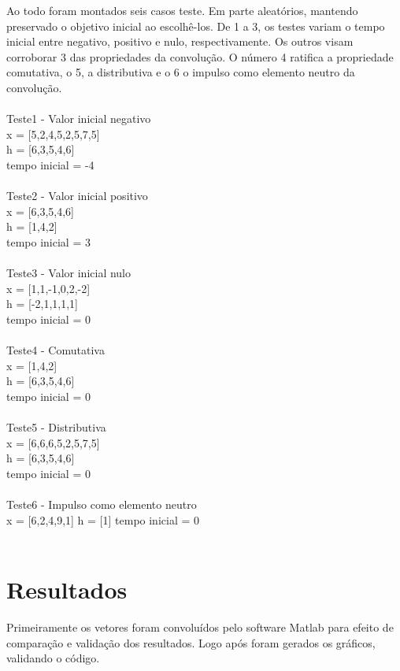 \documentclass[dvipdfm, a4paper, 11pt]{report}
\begin{document}
{Ao todo foram montados seis casos teste. Em parte aleatórios, mantendo preservado o objetivo inicial ao escolhê-los.
De 1 a 3, os testes variam o tempo inicial entre negativo, positivo e nulo, respectivamente. Os outros visam corroborar 3 das propriedades da convolução. O número 4 ratifica a propriedade comutativa, o 5, a distributiva e o 6 o impulso como elemento neutro da convolução.\\
\\
Teste1 - Valor inicial negativo\\
x = [5,2,4,5,2,5,7,5]\\
h = [6,3,5,4,6]\\
tempo inicial = -4\\
\\
Teste2 - Valor inicial positivo\\
x = [6,3,5,4,6]\\
h = [1,4,2]\\
tempo inicial = 3\\
\\
Teste3 - Valor inicial nulo\\
x = [1,1,-1,0,2,-2]\\
h = [-2,1,1,1,1]\\
tempo inicial = 0\\
\\
Teste4 - Comutativa\\
x = [1,4,2]\\
h = [6,3,5,4,6]\\
tempo inicial = 0\\
\\
Teste5 - Distributiva\\
x = [6,6,6,5,2,5,7,5]\\
h = [6,3,5,4,6]\\
tempo inicial = 0\\
\\
Teste6 - Impulso como elemento neutro\\
x = [6,2,4,9,1]
h = [1]
tempo inicial = 0\\
\\
\chapter{Resultados}\label{result}
Primeiramente os vetores foram convoluídos pelo software Matlab para efeito de comparação e validação dos resultados. Logo após foram gerados os gráficos, validando o código.
}
\end{document}
